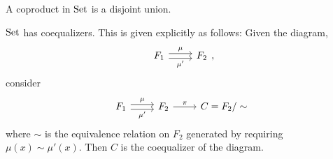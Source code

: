\documentclass[12pt]{article}
\begin{document}
\begin{proposition}
	A coproduct in $\text{Set}$ is a disjoint union.
\end{proposition}

\begin{proposition}
	$\text{Set}$ has coequalizers. This is given explicitly as follows: Given the diagram,
	\begin{equation*}
\begin{tikzcd}
F_1 \arrow[r, "\mu", shift left] \arrow[r, "\mu'"', shift right] & F_2
\end{tikzcd},
	\end{equation*}
	consider 
	\begin{equation*}
\begin{tikzcd}
F_1 \arrow[r, "\mu", shift left] \arrow[r, "\mu'"', shift right] & F_2 \arrow[r, "\pi"] & C=F_2/\sim
\end{tikzcd}
	\end{equation*}
	where $\sim$ is the equivalence relation on $F_2$ generated by requiring $\mu(x)\sim\mu'(x)$. Then $C$ is the coequalizer of the diagram.
\end{proposition}
\end{document}
